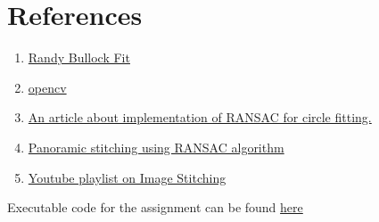 \section*{References}
\begin{enumerate}
    \item \href{https://dtcenter.org/sites/default/files/community-code/met/docs/write-ups/circle_fit.pdf}{Randy Bullock Fit}
    \item \href{https://docs.opencv.org/4.x/}{opencv}
    \item \href{https://sdg002.github.io/ransac-circle/index.html}{An article about implementation of RANSAC for circle fitting.}
    \item \href{https://programmer.group/panoramic-stitching-using-ransac-algorithm.html}{Panoramic stitching using RANSAC algorithm}
    \item \href{https://youtu.be/J1DwQzab6Jg}{Youtube playlist on Image Stitching}
\end{enumerate}
\HRule
\vspace*{-.2cm}
\begin{center}
    Executable code for the assignment can be found \href{https://github.com/sanjith1999/EN2550-Assignments/tree/master/Fitting%20and%20Alignment}{here}
\end{center}
